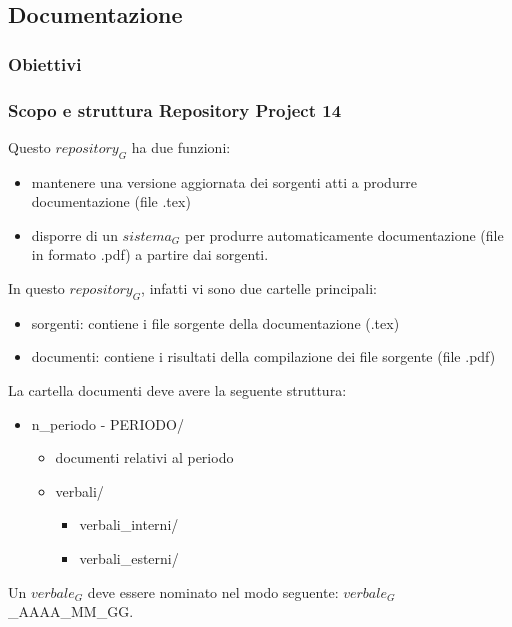 \subsection{Documentazione}
\subsubsection{Obiettivi}

\subsubsection{Scopo e struttura Repository Project 14}
Questo $\textit{repository}_G$ ha due funzioni:

\begin{itemize}
    \item mantenere una versione aggiornata dei sorgenti atti a produrre documentazione (file .tex)
    \item disporre di un $\textit{sistema}_G$ per produrre automaticamente documentazione (file in formato .pdf) a partire dai sorgenti.
\end{itemize}

In questo $\textit{repository}_G$, infatti vi sono due cartelle principali:
\begin{itemize}
    \item sorgenti: contiene i file sorgente della documentazione (.tex) 
    \item documenti: contiene i risultati della compilazione dei file sorgente (file .pdf)
\end{itemize}

La cartella documenti deve avere la seguente struttura:
\begin{itemize}
    \item n\_periodo - PERIODO/
    \begin{itemize}
        \item documenti relativi al periodo
        \item verbali/
        \begin{itemize}
            \item verbali\_interni/    
            \item verbali\_esterni/
        \end{itemize}
    \end{itemize}
\end{itemize}

Un $\textit{verbale}_G$ deve essere nominato nel modo seguente: $\textit{verbale}_G$\_AAAA\_MM\_GG.

